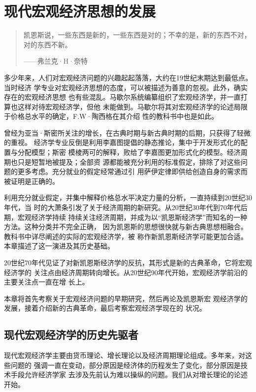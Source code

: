 \chapter{现代宏观经济思想的发展}

\begin{quotation}
  凯恩斯说，一些东西是新的，一些东西是对的；不幸的是，新的东西不对，对的东西不新。

  \raggedleft ——弗兰克·H·奈特
\end{quotation}

多少年来，人们对宏观经济问题的兴趣起起落落，大约在19世纪末期达到最低点。当时经济
学专业对宏观经济思想的态度，可以被描述为善意的忽视。此外，确实存在的宏观经济思想
也有些混乱。马歇尔系统编纂组织了宏观经济学，并一直打算也这样对待宏观经济学，但他
未能做到。马歇尔将其对宏观经济学的论述局限于价格总水平的确定，F.W·陶西格在其介绍
性的教科书中也是如此。

曾经为亚当·斯密所关注的增长，在古典时期与新古典时期的后期，只获得了轻微的重视。
经济学专业反倒是利用李嘉图提倡的静态推论，集中于开发形式化的配置与分配模型；斯密
模棱两可的解释，败给了李嘉图更加形式化的模型。经济周期也只是短暂地被提及；全部资
源都能被充分利用的标准假定，排除了对这些问题的更多考虑。充分就业的假定经常通过引
用萨伊定律即供给创造自身的需求而被证明是正确的。

利用充分就业假定，并集中解释价格总水平决定力量的分析，一直持续到20世纪30年代，当
时的大萧条引发了关于经济周期的新研究。从20世纪30年代到70年代后期，宏观经济学持续
持续关注经济周期，并成为以“凯恩斯经济学”而知名的一种方法。这种分类并不完全正确，
因为凯恩斯的思想很快就与新古典思想相融合。教科书中详尽阐述的实际的宏观经济学，被
称作新凯恩斯经济学可能更加合适。本章描述了这一演进及其历史基础。

20世纪70年代见证了对新凯恩斯经济学的反抗，其形式是新的古典革命，它将宏观经济学的
关注点由经济周期转向增长。从20世纪90年代开始，宏观经济学前沿的主要关注点一直在增
长上。

本章将首先考察关于宏观经济问题的早期研究，然后再论及凯恩斯宏
观经济学的发展，接着介绍新的古典革命，最后考察宏观经济学现在的
状况。

\section{现代宏观经济学的历史先驱者}

现代宏观经济学主要由货币理论、增长理论以及经济周期理论组成。多年来，对这些问题的
强调一直在变动，部分原因是经济体的历程发生了变化，部分原因是技术手段允许经济学家
去涉及先前认为难以操纵的问题。我们从对增长理论的论述开始。

